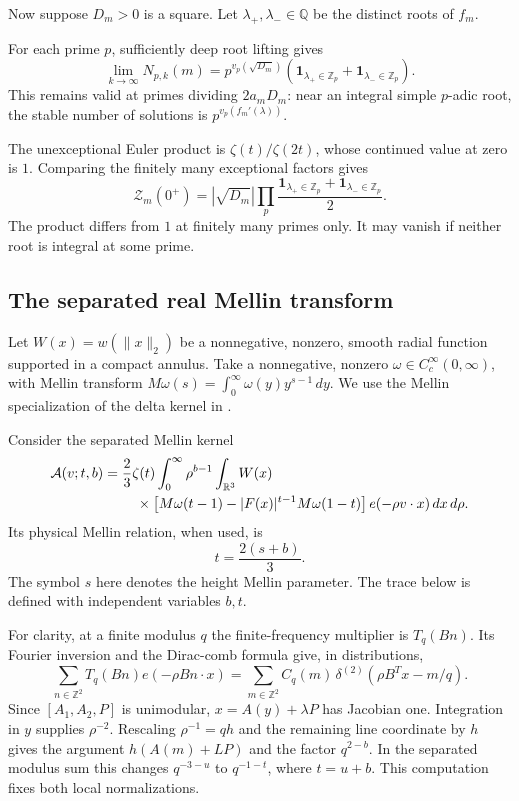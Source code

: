 \documentclass[11pt]{article}
\begin{document}
Now suppose $D_m>0$ is a square. Let
$\lambda_+,\lambda_-\in\mathbb Q$ be the
distinct roots of $f_m$.

For each prime $p$, sufficiently deep root
lifting gives
\[
\lim_{k\to\infty}N_{p,k}(m)
=
p^{v_p(\sqrt{D_m})}
\left(
\mathbf1_{\lambda_+\in\mathbb Z_p}
+\mathbf1_{\lambda_-\in\mathbb Z_p}
\right).
\]
This remains valid at primes dividing
$2a_mD_m$: near an integral simple
$p$-adic root, the stable number of
solutions is $p^{v_p(f_m'(\lambda))}$.

The unexceptional Euler product is
$\zeta(t)/\zeta(2t)$, whose continued
value at zero is $1$.
Comparing the finitely many exceptional
factors gives
\begin{equation}\label{eq:app-split-value}
\boxed{
\mathcal Z_m(0^+)
=
|\sqrt{D_m}|
\prod_p
\frac{
\mathbf1_{\lambda_+\in\mathbb Z_p}
+\mathbf1_{\lambda_-\in\mathbb Z_p}
}{2}.
}
\end{equation}
The product differs from $1$ at finitely
many primes only. It may vanish if neither
root is integral at some prime.

\subsection{The separated real Mellin transform}

Let $W(x)=w(\|x\|_2)$ be a nonnegative,
nonzero, smooth radial function supported
in a compact annulus. Take a nonnegative, nonzero $\omega\in C_c^\infty(0,\infty)$, with
Mellin transform $M\omega(s)=\int_0^\infty \omega(y)y^{s-1}\,dy$.
We use the Mellin specialization of the delta kernel in
\cite{HB}.

Consider the separated Mellin kernel
\begin{align}
\mathcal A(v;t,b)
={}&\frac23\zeta(t)
\int_0^\infty\rho^{b-1}
\int_{\mathbb R^3}W(x)\notag\\
&\quad\times
\left[
M\omega(t-1)
-|F(x)|^{t-1}M\omega(1-t)
\right]e(-\rho v\cdot x)\,dx\,d\rho.
\label{eq:app-kernel}
\end{align}
Its physical Mellin relation, when used,
is
\[
t=\frac{2(s+b)}3.
\]
The symbol $s$ here denotes the height Mellin parameter. The trace
below is defined with independent variables $b,t$.

For clarity, at a finite modulus $q$ the finite-frequency multiplier
is $T_q(Bn)$. Its Fourier inversion and the Dirac-comb formula give,
in distributions,
\[
 \sum_{n\in\mathbb Z^2}T_q(Bn)e(-\rho Bn\cdot x)
 =\sum_{m\in\mathbb Z^2}C_q(m)\,
       \delta^{(2)}(\rho B^Tx-m/q).
\]
Since $[A_1,A_2,P]$ is unimodular, $x=A(y)+\lambda P$ has Jacobian
one. Integration in $y$ supplies $\rho^{-2}$. Rescaling
$\rho^{-1}=qh$ and the remaining line coordinate by $h$ gives the
argument $h(A(m)+LP)$ and the factor $q^{2-b}$. In the separated
modulus sum this changes $q^{-3-u}$ to $q^{-1-t}$, where $t=u+b$.
This computation fixes both local normalizations.
\end{document}
